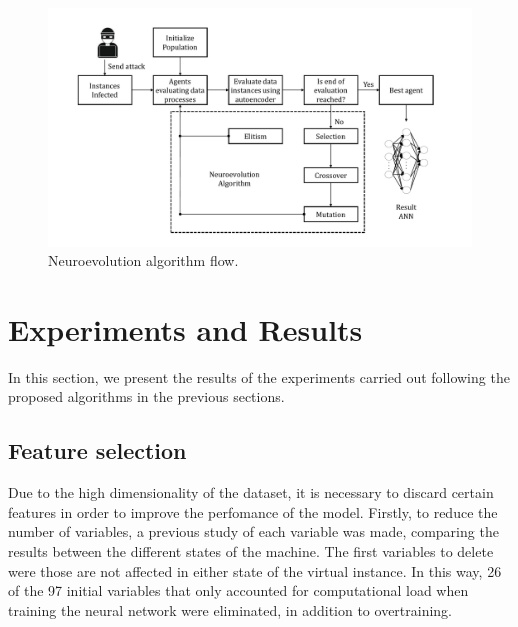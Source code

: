 \documentclass{iosart2c}
\begin{document}
\begin{figure}[h!]
\includegraphics[scale=0.5]{figs/neuroevolution/diag_neuroevolution.pdf}
\vspace{-0.5cm}
\caption{Neuroevolution algorithm flow.}
\label{fig:diagneuroevolution}
\end{figure}




\section{Experiments and Results}
In this section, we present the results of the experiments carried out following the proposed algorithms in the previous sections. 



\subsection{Feature selection}

Due to the high dimensionality of the dataset, it is necessary to discard certain features in order to improve the perfomance of the model. Firstly, to reduce the number of variables, a previous study of each variable was made, comparing the results between the different states of the machine. The first variables to delete were those are not affected in either state of the virtual instance. In this way, 26 of the 97 initial variables that only accounted for computational load when training the neural network were eliminated, in addition to overtraining. \\
\end{document}
